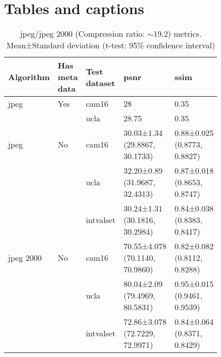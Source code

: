 \documentclass[review]{elsarticle}
\begin{document}







\section{Tables and captions}
\begin{table}[!h]
    \centering
    \begin{tabular}{p{0.15\linewidth} p{0.1\linewidth} p{0.1\linewidth} p{0.25\linewidth} p{0.24\linewidth}}
    \toprule
    \textbf{Algorithm} & \textbf{Has meta data} & \textbf{Test dataset} & \textbf{\gls{psnr}} & \textbf{\gls{ssim}} \\
    \bottomrule
    jpeg & Yes & \gls{cam16} & 28 & 0.35 \\
    & & \gls{ucla} & 28.75 & 0.35 \\
    \bottomrule
    
    jpeg & No & \gls{cam16} & 30.03±1.34 (29.8867, 30.1733) & 0.88±0.025 (0.8773, 0.8827) \\
    & & \gls{ucla} & 32.20±0.89 (31.9687, 32.4313) & 0.87±0.018 (0.8653, 0.8747) \\
    & & \gls{intvalset} & 30.24±1.31 (30.1816, 30.2984) & 0.84±0.038 (0.8383, 0.8417) \\
    \bottomrule
    
    jpeg 2000 & No & \gls{cam16} & 70.55±4.078 (70.1140, 70.9860) & 0.82±0.082 (0.8112, 0.8288) \\
    & & \gls{ucla} & 80.04±2.09 (79.4969, 80.5831) & 0.95±0.015 (0.9461, 0.9539) \\
    & & \gls{intvalset} & 72.86±3.078 (72.7229, 72.9971) & 0.84±0.064 (0.8371, 0.8429) \\
    \bottomrule
    \end{tabular}
    \caption{jpeg/jpeg 2000 (Compression ratio: $\sim$19.2) metrics. Mean±Standard deviation (t-test: 95\% confidence interval)}
    \label{tab:my_label}
\end{table}
\end{document}
